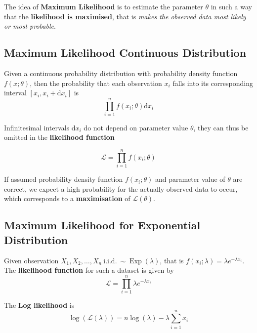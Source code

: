 \documentclass[11pt]{article}
\theoremstyle{definition}
\newcommand*\Likelihood{\mathcal{L}}
\newcommand*\Exp[1]{\mathop{\text{Exp}}\left(#1\right)}
\begin{document}
The idea of \textbf{Maximum Likelihood} is to estimate the parameter $\theta$ in such a way that the \textbf{likelihood is maximised}, that is \emph{makes the observed data most likely or most probable}.

\subsection{Maximum Likelihood Continuous Distribution}
Given a continuous probability distribution  with probability density function $f (x;\theta)$, then the probability that each observation $x_i$ falls into its corresponding interval $[x_i, x_i + \text{d}x_i]$ is
\begin{equation*}
	\prod_{i=1}^{n} f(x_i; \theta) \text{d}x_i
\end{equation*}

Infinitesimal intervals $\text{d}x_i$ do not depend on parameter value $\theta$, they can thus be omitted in the \textbf{likelihood function}

\begin{equation*}
	\Likelihood = \prod_{i=1}^{n} f(x_i;\theta)
\end{equation*}

If assumed probability density function $f (x_i ;\theta)$ and parameter value of $\theta$ are correct, we expect a high probability for the actually observed data to occur, which corresponds to a \textbf{maximisation} of $\Likelihood(\theta)$.

\subsection{Maximum Likelihood for Exponential Distribution}
Given observation $X_1, X_2, \dots, X_n\ \text{i.i.d.}\ \sim \Exp{\lambda}$, that is $f(x_i;\lambda) = \lambda e^{-\lambda x_i}$. The \textbf{likelihood function} for such a  dataset is given by
\begin{equation*}
	\Likelihood = \prod_{i=1}^{n} \lambda e^{-\lambda x_i}
\end{equation*}

The \textbf{Log likelihood} is
\begin{equation*}
	\log(\Likelihood(\lambda)) = n\log(\lambda) - \lambda\sum_{i=1}^n x_i
\end{equation*}
\end{document}
